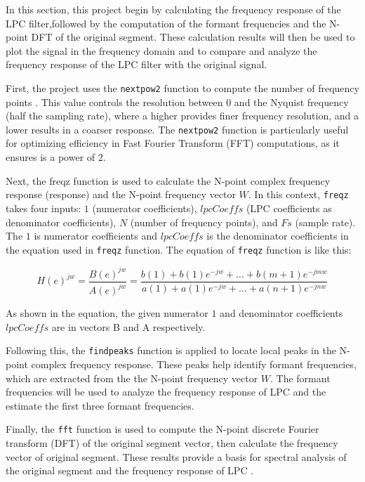 \documentclass{article}
\begin{document}
In this section, this project begin by calculating the frequency response of the LPC filter,followed by the computation of the formant frequencies and the N-point DFT of the original segment. These calculation results will then be used to plot the signal in the frequency domain and to compare and analyze the frequency response of the LPC filter with the original signal.

First, the project uses the \verb+nextpow2+ function to compute the number of frequency points . This value controls the resolution between $0$ and the Nyquist frequency (half the sampling rate), where a higher provides finer frequency resolution, and a lower results in a coarser response. The \verb+nextpow2+ function is particularly useful for optimizing efficiency in Fast Fourier Transform (FFT) computations, as it ensures is a power of $2$.

Next, the freqz function is used to calculate the N-point complex frequency response (response) and the N-point frequency vector $W$. In this context, \verb+freqz+ takes four inputs: $1$ (numerator coefficients), $lpcCoeffs$ (LPC coefficients as denominator coefficients), $N$ (number of frequency points), and $Fs$ (sample rate). The $1$ is numerator coefficients and $lpcCoeffs$ is the denominator coefficients in the equation used in \verb+freqz+ function. The equation of \verb+freqz+ function is like this:

\begin{equation}
\label{eqn:freqz}
H(e)^{jw} = \frac{B(e)^{jw}}{A(e)^{jw}} = \frac{b(1) + b(1)e^{-jw} + \dots + b(m+1)e^{-jmw}}{a(1) + a(1)e^{-jw} + \dots + a(n+1)e^{-jnw}}
\end{equation}

As shown in the equation, the given numerator $1$ and denominator coefficients $lpcCoeffs$ are in vectors B and A respectively.

Following this, the \verb+findpeaks+ function is applied to locate local peaks in the N-point complex frequency response. These peaks help identify formant frequencies, which are extracted from the the N-point frequency vector $W$.  The formant frequencies will be used to analyze the frequency response of LPC and the estimate the first three formant frequencies. 

Finally, the \verb+fft+ function is used to compute the N-point discrete Fourier transform (DFT) of the original segment vector, then calculate the frequency  vector of original segment. These results provide a basis for spectral analysis of the original segment and the frequency response of LPC .
\end{document}
